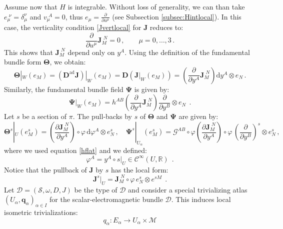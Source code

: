 \documentclass[10pt, cmp, numbook, final, a4paper]{svjour}
\newcommand*{\SavedEqref}{}
\let\SavedEqref\eqref
\renewcommand*{\eqref}[1]{%
  \begingroup
    \hypersetup{
      linkcolor=blue,
      linkbordercolor=blue,
    }%
    \SavedEqref{#1}%
  \endgroup
}
\def\ad{\mathrm{ad}}
\def\bD{\mathbb{D}}
\def\dd{\mathrm{d}}
\def\ad{\mathrm{ad}}
\def\bcD{\boldsymbol{\mathcal{D}}}
\def\bJ{\mathbf{J}}
\def\bJ{\mathbf{J}}
\def\bTheta{\mathbf{\Theta}}
\def\bPsi{\mathbf{\Psi}}
\newcommand{\ben}{\begin{equation}}
\newcommand{\een}{\end{equation}}
\def\cC{{\mathcal C}}
\newcommand{\cM}{\mathcal{M}}
\def\cD{\mathcal{D}}
\def\cG{\mathcal{G}}
\def\cC{\mathcal{C}}
\def\cS{\mathcal{S}}
\def\bD{\mathbf{D}}
\def\bD{\mathbf{D}}
\def\mq{\mathbf{q}}
\begin{document}
Assume now that $H$ is integrable. Without loss of
generality, we can than take $e_{\mu}^{\,\,\nu} = \delta^{\nu}_{\mu}$ and
$v_{\mu}^{\,\, A} =0$, thus $e_\mu=\frac{\partial}{\partial u^\mu}$
(see Subsection \ref{subsec:Hintlocal}). In this case, the verticality
condition \eqref{Jvertlocal} for $\bJ$ reduces to:
\ben
\label{Jvertlocalint}
\frac{\partial}{\partial u^{\mu}} \bJ_{M}^{\,\,N} = 0\, , \qquad \mu = 0,\hdots, 3\, .
\een
This shows that $ \bJ_{M}^{\,\,N}$ depend only on $y^{A}$. Using the definition of the fundamental bundle
form $\bTheta$, we obtain:
\begin{equation*}
\bTheta|_{W}(e_{M}) = (\bD^{\ad}\bJ)|_{W} (e_{M}) = \bD (\bJ|_{W}(e_{M})) = \left(\frac{\partial}{\partial y^{A}} \bJ_{M}^{\,\, N}\right) \dd y^{A} \otimes e_{N}\, .
\end{equation*}
Similarly, the fundamental bundle field $\bPsi$ is given by:
\begin{equation*}
\bPsi|_{W}(e_{M}) = h^{AB} \left(\frac{\partial}{\partial y^{A}} \bJ_{M}^{\,\, N}\right) \frac{\partial}{\partial y^{B}} \otimes e_{N}~~.
\end{equation*}
Let $s$ be a section of $\pi$. The pull-backs by $s$ of $\bTheta$ and $\bPsi$ are given by:
\begin{equation}
\label{eq:localThetaPsi}
\bTheta^{s}|_{U}(e^{s}_{M}) = \left(\frac{\partial \bJ_{M}^{\,\, N}}{\partial y^{A}}\right)\circ \varphi \, \dd\varphi^{A} \otimes e^{s}_{N}\, , 
\quad \bPsi^{s}|_{U_{\alpha}}(e^{s}_{M}) = \cG^{AB}\circ \varphi \left(\frac{\partial \bJ_{M}^{\,\, N}}{\partial y^{A}} \right)\circ \varphi \, 
\left(\frac{\partial}{\partial y^{B}}\right)^s \otimes e^{s}_{N}\, ,
\end{equation}
where we used equation \eqref{hflat} and we defined:
\begin{equation*}
\varphi^{A} = y^{A}\circ s|_{U} \in \cC^{\infty}(U,\mathbb{R})~~.
\end{equation*}
Notice that the pullback of $\bJ$ by $s$ has the local form:
\begin{equation*}
\bJ^{s}|_{U} = \bJ_{M}^{\,\,N}\circ \varphi \, e^{s}_{N}\otimes e^{s M}~~.
\end{equation*}
Let $\cD = (\cS, \omega, D, J)$ be the type of $\bcD$ and consider a
special trivializing atlas $(U_{\alpha}, \mq_{\alpha})_{\alpha\in I}$
for the scalar-electromagnetic bundle $\bcD$. This induces local
isometric trivializations:
\begin{equation*}
q_{\alpha}\colon E_{\alpha} \to U_{\alpha}\times \cM
\end{equation*}
\end{document}
